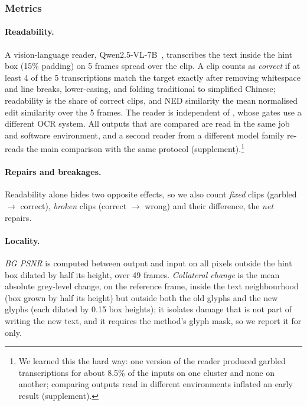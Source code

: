 \subsubsection{Metrics}
\label{sec:metrics}
\paragraph{Readability.} A vision-language reader, Qwen2.5-VL-7B~\cite{bai2025qwen25vl}, transcribes the text inside the hint box (15\% padding) on 5 frames spread over the clip. A clip counts as \emph{correct} if at least 4 of the 5 transcriptions match the target exactly after removing whitespace and line breaks, lower-casing, and folding traditional to simplified Chinese; readability is the share of correct clips, and NED similarity the mean normalised edit similarity over the 5 frames. The reader is independent of \method, whose gates use a different OCR system. All outputs that are compared are read in the same job and software environment, and a second reader from a different model family re-reads the main comparison with the same protocol (supplement).\footnote{We learned this the hard way: one version of the reader produced garbled transcriptions for about 8.5\% of the inputs on one cluster and none on another; comparing outputs read in different environments inflated an early result (supplement).}

\paragraph{Repairs and breakages.} Readability alone hides two opposite effects, so we also count \emph{fixed} clips (garbled $\to$ correct), \emph{broken} clips (correct $\to$ wrong) and their difference, the \emph{net} repairs.

\paragraph{Locality.} \emph{BG PSNR} is computed between output and input on all pixels outside the hint box dilated by half its height, over 49 frames. \emph{Collateral change} is the mean absolute grey-level change, on the reference frame, inside the text neighbourhood (box grown by half its height) but outside both the old glyphs and the new glyphs (each dilated by 0.15 box heights); it isolates damage that is not part of writing the new text, and it requires the method's glyph mask, so we report it for \method only.

